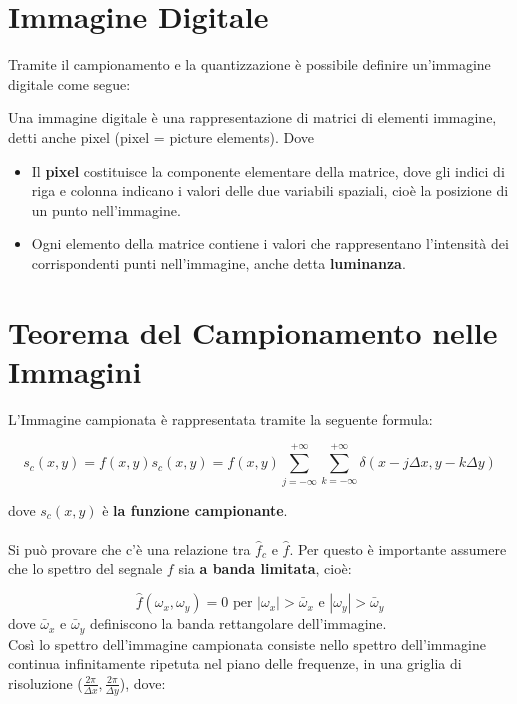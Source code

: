 \section{Immagine Digitale}
Tramite il campionamento e la quantizzazione è possibile definire un'immagine
digitale come segue:
\begin{definition}
    Una immagine digitale è una rappresentazione di matrici di elementi
    immagine, detti anche pixel (pixel = picture elements). Dove

    \begin{itemize}
        \item Il \textbf{pixel} costituisce la componente elementare della matrice,
              dove gli indici di riga e colonna indicano i valori delle due
              variabili spaziali, cioè la posizione di un punto nell'immagine.
        \item Ogni elemento della matrice contiene i valori che rappresentano
              l'intensità dei corrispondenti punti nell'immagine, anche detta
              \textbf{luminanza}.
    \end{itemize}
\end{definition}

\section{Teorema del Campionamento nelle Immagini}
L'Immagine campionata è rappresentata tramite la seguente formula:

$$
    s_c(x,y) = f(x,y)s_c(x,y)=f(x,y)\sum_{j=-\infty}^{+\infty}
    \sum_{k=-\infty}^{+\infty} \delta (x-j \Delta x, y-k \Delta y)
$$

dove $s_c(x,y)$ è \textbf{la funzione campionante}. \\\\Si può provare che c'è
una relazione tra $\hat{f}_c$ e $\hat{f}$. Per questo è importante assumere che
lo spettro del segnale $f$ sia \textbf{a banda limitata}, cioè:

$$
    \hat{f}(\omega_x, \omega_y)=0 \text{ per } |\omega_x| > \bar{\omega}_x \text{ e } |\omega_y| > \bar{\omega}_y
$$
dove $\bar{\omega}_x$ e $\bar{\omega}_y$ definiscono la banda rettangolare dell'immagine.
\\Così lo spettro dell'immagine campionata consiste nello spettro dell'immagine
continua infinitamente ripetuta nel piano delle frequenze, in una griglia di
risoluzione ($\frac{2\pi}{\Delta x}, \frac{2 \pi}{\Delta y}$), dove:

